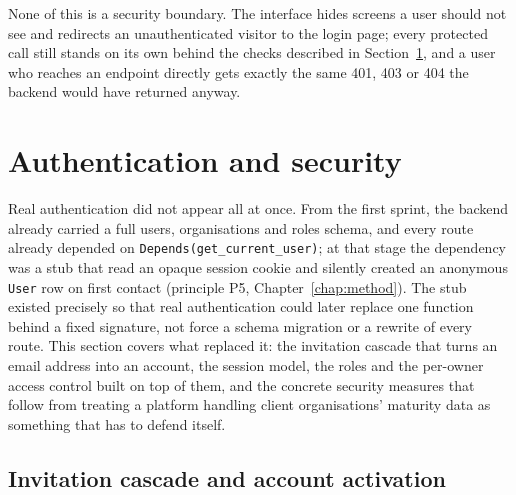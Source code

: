 None of this is a security boundary. The interface hides screens a user should not see and redirects an unauthenticated visitor to the login page; every protected call still stands on its own behind the checks described in Section~\ref{sec:platform-auth-security}, and a user who reaches an endpoint directly gets exactly the same 401, 403 or 404 the backend would have returned anyway.

\section{Authentication and security}
\label{sec:platform-auth-security}

Real authentication did not appear all at once. From the first sprint, the backend already carried a full users, organisations and roles schema, and every route already depended on \texttt{Depends(get\_\allowbreak current\_\allowbreak user)}; at that stage the dependency was a stub that read an opaque session cookie and silently created an anonymous \texttt{User} row on first contact (principle P5, Chapter~\ref{chap:method}). The stub existed precisely so that real authentication could later replace one function behind a fixed signature, not force a schema migration or a rewrite of every route. This section covers what replaced it: the invitation cascade that turns an email address into an account, the session model, the roles and the per-owner access control built on top of them, and the concrete security measures that follow from treating a platform handling client organisations' maturity data as something that has to defend itself.

\subsection{Invitation cascade and account activation}

